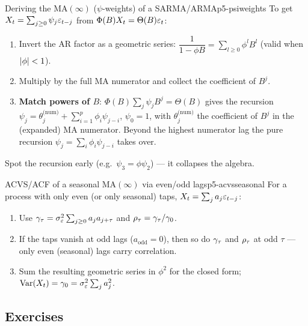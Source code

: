 \begin{keytech}{Deriving the MA$(\infty)$ ($\psi$-weights) of a SARMA/ARMA}{p5-psiweights}
To get $X_t=\sum_{j\ge0}\psi_j\varepsilon_{t-j}$ from $\Phi(B)X_t=\Theta(B)\varepsilon_t$:
\begin{enumerate}
  \item Invert the AR factor as a geometric series:
        $\dfrac{1}{1-\phi B}=\sum_{l\ge0}\phi^{l}B^{l}$ (valid when
        $\left\lvert \phi \right\rvert<1$).
  \item Multiply by the full MA numerator and collect the coefficient of
        $B^{j}$.
  \item \textbf{Match powers of $B$}: $\Phi(B)\sum_j\psi_jB^{j}=\Theta(B)$ gives
        the recursion
        $\psi_j=\theta^{\text{(num)}}_j+\sum_{i=1}^{p}\phi_i\psi_{j-i}$,
        $\psi_0=1$, with $\theta^{\text{(num)}}_j$ the coefficient of $B^{j}$ in
        the (expanded) MA numerator. Beyond the highest numerator lag the pure
        recursion $\psi_j=\sum_i\phi_i\psi_{j-i}$ takes over.
\end{enumerate}
Spot the recursion early (e.g.\ $\psi_3=\phi\psi_2$) --- it collapses the
algebra.
\end{keytech}

\begin{keytech}{ACVS/ACF of a seasonal MA$(\infty)$ via even/odd lags}{p5-acvsseasonal}
For a process with only even (or only seasonal) taps,
$X_t=\sum_j a_j\varepsilon_{t-j}$:
\begin{enumerate}
  \item Use $\gamma_\tau=\sigma_\varepsilon^2\sum_{j\ge0}a_j a_{j+\tau}$ and
        $\rho_\tau=\gamma_\tau/\gamma_0$.
  \item If the taps vanish at odd lags ($a_{\text{odd}}=0$), then so do
        $\gamma_\tau$ and $\rho_\tau$ at odd $\tau$ --- only even (seasonal) lags
        carry correlation.
  \item Sum the resulting geometric series in $\phi^{2}$ for the closed form;
        $\operatorname{Var}(X_t)=\gamma_0=\sigma_\varepsilon^2\sum_j a_j^2$.
\end{enumerate}
\end{keytech}

\subsection{Exercises}

